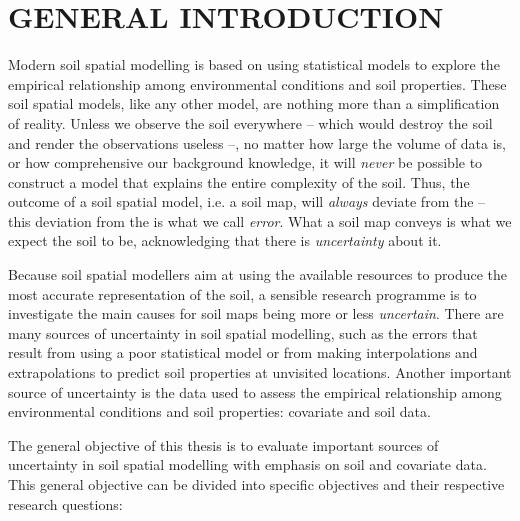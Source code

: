 \setcounter{page}{1}
\artigofalse
\chapter{GENERAL INTRODUCTION}
\label{chap:chap01}

Modern soil spatial modelling is based on using statistical models to explore the empirical relationship among 
environmental conditions and soil properties. These soil spatial models, like any other model, are nothing 
more than a simplification of reality. Unless we observe the soil everywhere -- which would destroy the 
soil and render the observations useless --, no matter how large the volume of data is, or how comprehensive 
our background knowledge, it will \emph{never} be possible to construct a model that explains the entire 
complexity of the soil. Thus, the outcome of a soil spatial model, i.e. a soil map, will \emph{always} deviate 
from the  -- this deviation from the  is what we call \emph{error}. What a soil map conveys 
is what we expect the soil to be, acknowledging that there is \emph{uncertainty} about it.

Because soil spatial modellers aim at using the available resources to produce the most accurate 
representation of the soil, a sensible research programme is to investigate the main causes for soil maps 
being more or less \emph{uncertain}. There are many sources of uncertainty in soil spatial modelling, such as 
the errors that result from using a poor statistical model or from making interpolations and extrapolations 
to predict soil properties at unvisited locations. Another important source of uncertainty is the data used to 
assess the empirical relationship among environmental conditions and soil properties: covariate and soil data.

The general objective of this thesis is to evaluate important sources of uncertainty in soil spatial modelling 
with emphasis on soil and covariate data. This general objective can be divided into specific objectives and 
their respective research questions:

